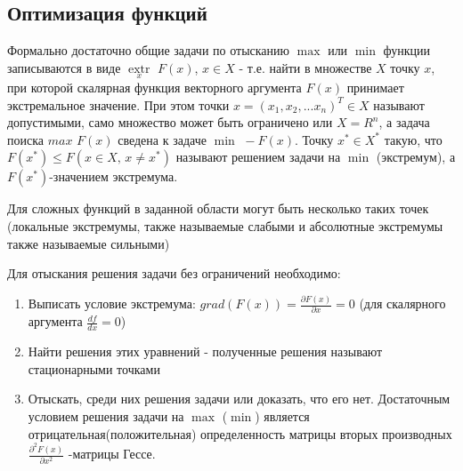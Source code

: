 \documentclass[preprint,russian,a5paper,10pt,twoside]{ncc}
\begin{document}
\subsection{Оптимизация функций}
\par Формально достаточно общие задачи по отысканию $\max$  или $\min$ функции записываются в виде $\underset{x}{\mathop{extr}}\,\,F\left( x \right)$, $x\in X$ - т.е. найти в множестве $X$ точку $x$, при которой скалярная функция векторного аргумента $F\left( x \right)$ принимает экстремальное значение. При этом точки $x={{\left( {{x}_{1}},{{x}_{2}},...{{x}_{n}} \right)}^{T}}\in X$ называют допустимыми, само множество может быть ограничено или $X={{R}^{n}}$, а задача поиска $max \,\,F\left( x \right)$ сведена к задаче $\min \,\,-F\left( x \right)$. Точку ${{x}^{*}}\in {{X}^{*}}$ такую, что $F\left( {{x}^{*}} \right)\le F\left( x\in X,\,x\ne {{x}^{*}} \right)$ называют решением задачи на $\min$ (экстремум), а $F\left( {{x}^{*}} \right)$-значением экстремума.
\par Для сложных функций в заданной области могут быть несколько таких точек (локальные экстремумы, также называемые слабыми и абсолютные экстремумы также называемые сильными)
\par Для отыскания решения задачи без ограничений необходимо:
\begin{enumerate}
\item Выписать условие экстремума: $grad\left( F\left( x \right) \right)=\frac{\partial F\left( x \right)}{\partial x}=0$ (для скалярного аргумента $\frac{df}{dx}=0$)
\item Найти решения этих уравнений - полученные решения называют стационарными точками
\item Отыскать, среди них решения задачи или доказать, что его нет. Достаточным условием решения задачи на $\max$ ($\min$) является отрицательная(положительная) определенность матрицы вторых производных $\frac{{{\partial }^{2}}F\left( x \right)}{\partial {{x}^{2}}}$ -матрицы Гессе.
\end{enumerate}
\end{document}
